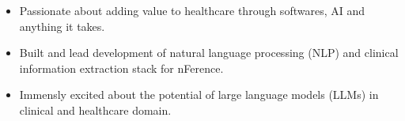 \documentclass[10pt,a4paper,ragged2e,withhyper]{altacv}
\begin{document}

\makecvheader


\begin {itemize}
\item Passionate about adding value to healthcare through softwares, AI and anything it takes. 
\item Built and lead development of natural language processing (NLP) and clinical information extraction stack for nFerence.
\item Immensly excited about the potential of large language models (LLMs) in clinical and healthcare domain.
\end{itemize}
\hspace{2mm}
\end{document}
